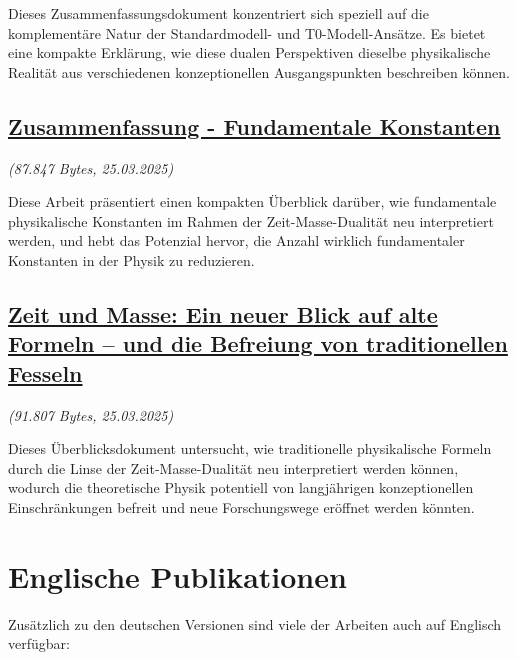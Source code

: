 \documentclass[a4paper,12pt]{article}
\newcommand{\repobase}{https://github.com/jpascher/T0-Time-Mass-Duality/tree/main/2/}
\begin{document}
	Dieses Zusammenfassungsdokument konzentriert sich speziell auf die komplementäre Natur der Standardmodell- und T0-Modell-Ansätze. Es bietet eine kompakte Erklärung, wie diese dualen Perspektiven dieselbe physikalische Realität aus verschiedenen konzeptionellen Ausgangspunkten beschreiben können.
	
	\subsection{\href{\repobase/pdf/Deutsch kurzgefasst/Zusammenfassung - Fundamentale Konstanten.pdf}{Zusammenfassung - Fundamentale Konstanten}}
	\textit{(87.847 Bytes, 25.03.2025)}
	
	Diese Arbeit präsentiert einen kompakten Überblick darüber, wie fundamentale physikalische Konstanten im Rahmen der Zeit-Masse-Dualität neu interpretiert werden, und hebt das Potenzial hervor, die Anzahl wirklich fundamentaler Konstanten in der Physik zu reduzieren.
	
	\subsection{\href{\repobase/pdf/Deutsch kurzgefasst/Zeit und Masse Ein neuer Blick auf alte Formeln – und die Befreiung von traditionellen Fesseln.pdf}{Zeit und Masse: Ein neuer Blick auf alte Formeln – und die Befreiung von traditionellen Fesseln}}
	\textit{(91.807 Bytes, 25.03.2025)}
	
	Dieses Überblicksdokument untersucht, wie traditionelle physikalische Formeln durch die Linse der Zeit-Masse-Dualität neu interpretiert werden können, wodurch die theoretische Physik potentiell von langjährigen konzeptionellen Einschränkungen befreit und neue Forschungswege eröffnet werden könnten.
	
	\section{Englische Publikationen}
	
	Zusätzlich zu den deutschen Versionen sind viele der Arbeiten auch auf Englisch verfügbar:
	
\end{document}
